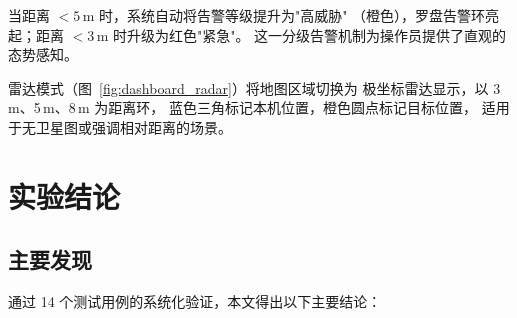 \documentclass[12pt, a4paper]{ctexart}
\begin{document}
当距离 $< 5$\,m 时，系统自动将告警等级提升为"高威胁"
（橙色），罗盘告警环亮起；距离 $< 3$\,m 时升级为红色"紧急"。
这一分级告警机制为操作员提供了直观的态势感知。

雷达模式（图~\ref{fig:dashboard_radar}）将地图区域切换为
极坐标雷达显示，以 3\,m、5\,m、8\,m 为距离环，
蓝色三角标记本机位置，橙色圆点标记目标位置，
适用于无卫星图或强调相对距离的场景。

\section{实验结论}
\label{sec:conclusion}

\subsection{主要发现}

通过 14 个测试用例的系统化验证，本文得出以下主要结论：
\end{document}

